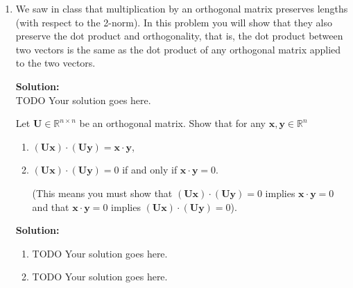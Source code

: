 \documentclass[]{article}
\newcommand{\R}{\mathbb{R}}				%
\newcommand{\x}{\bm{x}}					%
\newcommand{\y}{\bm{y}}					%
\newcommand{\solution}{\vskip 0.5cm \textbf{\large Solution:} \\}
\begin{document}
\begin{enumerate}
	  \solution
	  TODO Your solution goes here.


	\item We saw in class that multiplication by an orthogonal matrix preserves lengths (with respect to the 2-norm). In this problem you will show that they also preserve the dot product and orthogonality, that is, the dot product between two vectors is the same as the dot product of any orthogonal matrix applied to the two vectors.

	  \solution
	  TODO Your solution goes here.

	  Let $\bm{U}\in\R^{n\times n}$ be an orthogonal matrix. Show that for any $\x,\y\in\R^n$
	  \begin{enumerate}
	  \item $(\bm{Ux})\cdot(\bm{Uy})=\x\cdot\y$,
	  \item $(\bm{Ux})\cdot(\bm{Uy}) = 0$ if and only if $\x\cdot \y=0$.

		(This means you must show that $(\bm{Ux})\cdot(\bm{Uy}) = 0$ implies $\x\cdot \y=0$ and that $\x\cdot \y=0$ implies $(\bm{Ux})\cdot(\bm{Uy}) = 0$).
	  \end{enumerate}

	  \solution
	  \begin{enumerate}
	  \item TODO Your solution goes here.
	  \item TODO Your solution goes here. 
	  \end{enumerate}
    \end{enumerate}
\end{document}
